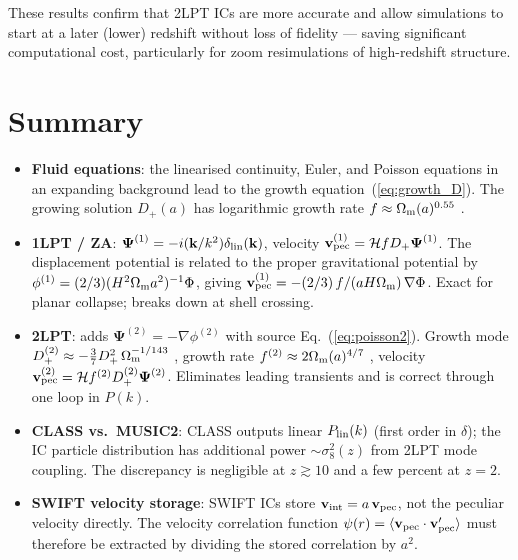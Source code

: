 \documentclass[12pt]{article}
\newcommand{\bk}{\mathbf{k}}
\newcommand{\bPsi}{\boldsymbol{\Psi}}
\newcommand{\bv}{\mathbf{v}}
\newcommand{\Dp}{D_+}
\newcommand{\Dpp}{D_+^{(2)}}
\newcommand{\Omm}{\Omega_{\rm m}}
\newcommand{\calH}{\mathcal{H}}
\begin{document}
These results confirm that 2LPT ICs are more accurate and allow
simulations to start at a later (lower) redshift without loss of
fidelity — saving significant computational cost, particularly
for zoom resimulations of high-redshift structure.

\section{Summary}

\begin{itemize}
  \item \textbf{Fluid equations}: the linearised continuity, Euler, and
        Poisson equations in an expanding background lead to the growth
        equation~(\ref{eq:growth_D}).  The growing solution $\Dp(a)$
        has logarithmic growth rate $f \approx \Omm(a)^{0.55}$
        \citep{Linder2005}.

  \item \textbf{1LPT / ZA}: $\bPsi^{(1)} = -i(\bk/k^2)\delta_{\rm lin}(\bk)$,
        velocity $\bv_{\rm pec}^{(1)} = \calH f\Dp\bPsi^{(1)}$.
        The displacement potential is related to the proper gravitational
        potential by $\phi^{(1)} = (2/3)(H^2\Omm a^2)^{-1}\Phi$,
        giving $\bv_{\rm pec}^{(1)} = -(2/3)\,f/(aH\Omm)\,\nabla\Phi$.
        Exact for planar collapse; breaks down at shell crossing.

  \item \textbf{2LPT}: adds $\bPsi^{(2)} = -\nabla\phi^{(2)}$ with source
        Eq.~(\ref{eq:poisson2}).  Growth mode
        $\Dpp \approx -\tfrac{3}{7}\Dp^2\,\Omm^{-1/143}$
        \citep{Crocce2006}, growth rate $f^{(2)} \approx 2\Omm(a)^{4/7}$
        \citep{Bouchet1995}, velocity
        $\bv_{\rm pec}^{(2)} = \calH f^{(2)}\Dpp\bPsi^{(2)}$.
        Eliminates leading transients and is correct through one loop
        in $P(k)$.

  \item \textbf{CLASS vs.\ MUSIC2}: CLASS outputs linear $P_{\rm lin}(k)$
        (first order in $\delta$); the IC particle distribution has
        additional power $\sim\sigma_8^2(z)$ from 2LPT mode coupling.
        The discrepancy is negligible at $z \gtrsim 10$ and a few percent
        at $z = 2$.

  \item \textbf{SWIFT velocity storage}: SWIFT ICs store
        $\bv_{\rm int} = a\,\bv_{\rm pec}$, not the peculiar velocity
        directly.  The velocity correlation function $\psi(r) =
        \langle\bv_{\rm pec}\cdot\bv_{\rm pec}'\rangle$ must therefore
        be extracted by dividing the stored correlation by $a^2$.
\end{itemize}
\end{document}
